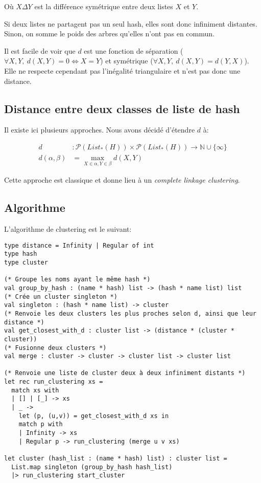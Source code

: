 Où $X \Delta Y$ est la différence symétrique entre deux listes $X$ et $Y$.

Si deux listes ne partagent pas un seul hash, elles sont donc infiniment distantes. Sinon, on somme le poids des arbres qu'elles n'ont pas en commun.

Il est facile de voir que $d$ est une fonction de séparation ($\forall X,Y,\ d(X,Y) = 0 \iff X = Y$) et symétrique ($\forall X,Y,\ d(X,Y) = d(Y,X)$). Elle ne respecte cependant pas l'inégalité triangulaire et n'est pas donc une distance.


\subsection{Distance entre deux classes de liste de hash}
Il existe ici plusieurs approches.
Nous avons décidé d'étendre $d$ à:

\begin{align*}
d &: \mathcal{P}(List_*(H)) \times \mathcal{P}(List_*(H)) \to \mathbb{N} \cup \{\infty\}\\
d(\alpha,\beta) &= \max\limits_{X \in \alpha, Y \in \beta} d(X,Y)
\end{align*}

Cette approche est classique et donne lieu à un \emph{complete linkage clustering}.

\subsection{Algorithme}
L'algorithme de clustering est le suivant:

\begin{verbatim}
type distance = Infinity | Regular of int
type hash
type cluster

(* Groupe les noms ayant le même hash *)
val group_by_hash : (name * hash) list -> (hash * name list) list
(* Crée un cluster singleton *)
val singleton : (hash * name list) -> cluster
(* Renvoie les deux clusters les plus proches selon d, ainsi que leur distance *)
val get_closest_with_d : cluster list -> (distance * (cluster * cluster))
(* Fusionne deux clusters *)
val merge : cluster -> cluster -> cluster list -> cluster list

(* Renvoie une liste de cluster deux à deux infiniment distants *)
let rec run_clustering xs =
  match xs with
  | [] | [_] -> xs
  | _ ->
    let (p, (u,v)) = get_closest_with_d xs in
    match p with
    | Infinity -> xs
    | Regular p -> run_clustering (merge u v xs)

let cluster (hash_list : (name * hash) list) : cluster list =
  List.map singleton (group_by_hash hash_list)
  |> run_clustering start_cluster
\end{verbatim}